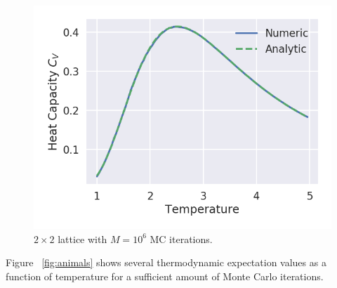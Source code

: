\documentclass[aps,reprint]{revtex4-1}
\begin{document}
\begin{figure}
  \centering
  \includegraphics[width=\columnwidth]{figures/L2Ne6.png}
  \caption{$2 \times 2$ lattice with $M = 10^6$ MC iterations.}
  \label{fig:L2Ne6}
\end{figure}
Figure ~\ref{fig:animals} shows several thermodynamic expectation values
as a function of temperature for a sufficient amount of Monte Carlo iterations.
\end{document}

